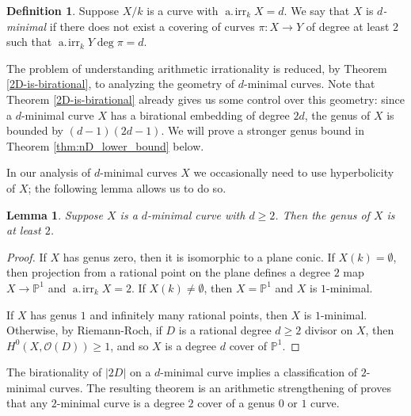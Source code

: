 \documentclass[11pt]{amsart}
\newcommand{\PP}{\mathbb{P}}
\newcommand{\calO}{\mathcal{O}}
\newcommand{\airr}{\operatorname{a.\!irr}}
\newtheorem{lemma}[theorem]{Lemma}
\theoremstyle{definition}
\newtheorem{definition}[theorem]{Definition}
\theoremstyle{remark}
\begin{document}
\begin{definition}
Suppose $X/k$ is a curve with $\airr_k X = d$. We say that $X$ is \emph{$d$-minimal} if there does not exist a covering of curves $\pi: X \to Y$ of degree at least $2$ such that $\airr_kY \deg \pi = d.$ 
\end{definition}

The problem of understanding arithmetic irrationality is reduced, by Theorem \ref{2D-is-birational}, to analyzing the geometry of $d$-minimal curves. Note that Theorem \ref{2D-is-birational} already gives us some control over this geometry: since a $d$-minimal curve $X$ has a birational embedding of degree $2d$, the genus of $X$ is bounded by $(d-1)(2d-1)$.  We will prove a stronger genus bound in Theorem \ref{thm:nD_lower_bound} below. 

In our analysis of $d$-minimal curves $X$ we occasionally need to use hyperbolicity of $X$; the following lemma allows us to do so.
\begin{lemma}\label{lem:genus-at-least-2}
Suppose $X$ is a $d$-minimal curve with $d \geqslant 2$. Then the genus of $X$ is at least $2$. 
\end{lemma}
\begin{proof}
If $X$ has genus zero, then it is isomorphic to a plane conic. If $X(k)=\emptyset$, then projection from a rational point on the plane defines a degree $2$ map $X \to \PP^1$ and $\airr_k X =2$. If $X(k) \neq \emptyset$, then $X = \PP^1$ and $X$ is $1$-minimal.

If $X$ has genus $1$ and infinitely many rational points, then $X$ is $1$-minimal. Otherwise, by Riemann-Roch, if $D$ is a rational degree $d\geqslant 2$ divisor on $X$, then $H^0(X, \calO(D)) \geqslant 1$, and so $X$ is a degree $d$ cover of $\PP^1$.
\end{proof}

The birationality of $|2D|$ on a $d$-minimal curve implies a classification of $2$-minimal curves. The resulting theorem is an arithmetic strengthening of \cite[Corollary 3]{Harris-Silverman1991} proves that any \(2\)-minimal curve is a degree \(2\) cover of a genus \(0\) or \(1\) curve.
\end{document}
